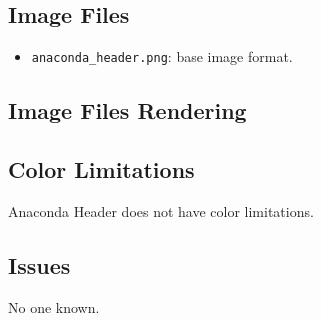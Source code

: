 \subsection{Image Files}
\hypertarget{sec:Distribution:Anaconda:Header:Identity:Images}{}
\label{sec:Distribution:Anaconda:Header:Identity:Images}

\begin{itemize}
\item \texttt{anaconda\_header.png}: base image format.
\end{itemize}

\subsection{Image Files Rendering}
\hypertarget{sec:Distribution:Anaconda:Header:Identity:Issues}{}
\label{sec:Distribution:Anaconda:Header:Identity:Issues}

\subsection{Color Limitations}
\hypertarget{sec:Distribution:Anaconda:Header:Identity:Colors}{}
\label{sec:Distribution:Anaconda:Header:Identity:Colors}

Anaconda Header does not have color limitations. 

\subsection{Issues}
\hypertarget{sec:Distribution:Anaconda:Header:Issues}{}
\label{sec:Distribution:Anaconda:Header:Issues}

No one known.
